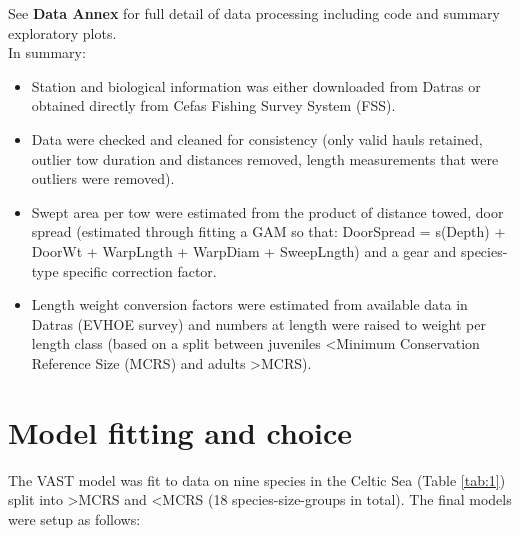 \documentclass[11pt]{article}
\begin{document}
See \textbf{Data Annex} for full detail of data processing including code and
summary exploratory plots. \\

In summary:

\begin{itemize}
	\item Station and biological information was either downloaded from
		Datras or obtained directly from Cefas Fishing Survey System
		(FSS).
	\item Data were checked and cleaned for consistency (only valid hauls
		retained, outlier tow duration and distances removed,
		length measurements that were outliers were removed).
	\item Swept area per tow were estimated from the product of distance
		towed,  door spread (estimated through fitting a GAM so that:
		DoorSpread = s(Depth) + DoorWt + WarpLngth + WarpDiam +
		SweepLngth) and a gear and species-type specific correction
		factor.
	\item Length weight conversion factors were estimated from available
		data in Datras (EVHOE survey) and numbers at length were raised
		to weight per length class (based on a split between juveniles
		\textless Minimum Conservation Reference Size (MCRS) and adults
		\textgreater MCRS).
\end{itemize}

\section{Model fitting and choice}

The VAST model was fit to data on nine species in the Celtic Sea (Table
\ref{tab:1}) split into \textgreater MCRS and \textless MCRS (18
species-size-groups in total). The final models were setup as follows:
\end{document}
